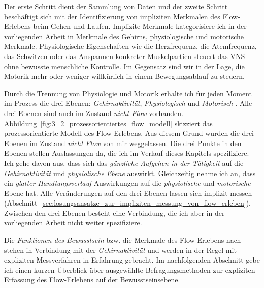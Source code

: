 Der erste Schritt dient der Sammlung von Daten und der zweite Schritt beschäftigt sich mit der Identifizierung von impliziten Merkmalen des Flow-Erlebens beim Gehen und Laufen. Implizite Merkmale kategorisiere ich in der vorliegenden Arbeit in Merkmale des Gehirns, physiologische und motorische Merkmale. Physiologische Eigenschaften wie die Herzfrequenz, die Atemfrequenz, das Schwitzen oder das Anspannen konkreter Muskelpartien steuert das \ac{VNS} ohne bewusste menschliche Kontrolle. Im Gegensatz sind wir in der Lage, die Motorik mehr oder weniger willkürlich in einem Bewegungsablauf zu steuern. 

Durch die Trennung von Physiologie und Motorik erhalte ich für jeden Moment im Prozess die drei Ebenen: \emph{Gehirnaktivität}, \emph{Physiologisch} und \emph{Motorisch} \citep[][S.~15]{Grueter2016a}. Alle drei Ebenen sind auch im Zustand \emph{nicht Flow} vorhanden. Abbildung~\ref{fig:3_2_prozessorientiertes_flow_modell} skizziert das prozessorientierte Modell des Flow-Erlebens. Aus diesem Grund wurden die drei Ebenen im Zustand \emph{nicht Flow} von mir weggelassen. Die drei Punkte in den Ebenen stellen Auslassungen da, die ich im Verlauf dieses Kapitels spezifiziere. Ich gehe davon aus, dass sich das \emph{gänzliche Aufgehen in der Tätigkeit} auf die \emph{Gehirnaktivität} und \emph{physiolische Ebene} auswirkt. Gleichzeitig nehme ich an, dass ein \emph{glatter Handlungsverlauf} Auswirkungen auf die \emph{physiolische} und \emph{motorische} Ebene hat. Alle Veränderungen auf den drei Ebenen lassen sich implizit messen (Abschnitt~\ref{sec:losungsansatze_zur_impliziten_messung_von_flow_erleben}). Zwischen den drei Ebenen besteht eine Verbindung, die ich aber in der vorliegenden Arbeit nicht weiter spezifiziere. 

Die \emph{Funktionen des Bewusstsein} bzw. die Merkmale des Flow-Erlebens nach \citet{Henk2014} stehen in Verbindung mit der \emph{Gehirnaktivität} und werden in der Regel mit expliziten Messverfahren in Erfahrung gebracht. Im nachfolgenden Abschnitt gebe ich einen kurzen Überblick über ausgewählte Befragungsmethoden zur expliziten Erfassung des Flow-Erlebens auf der Bewusstseinsebene. 

